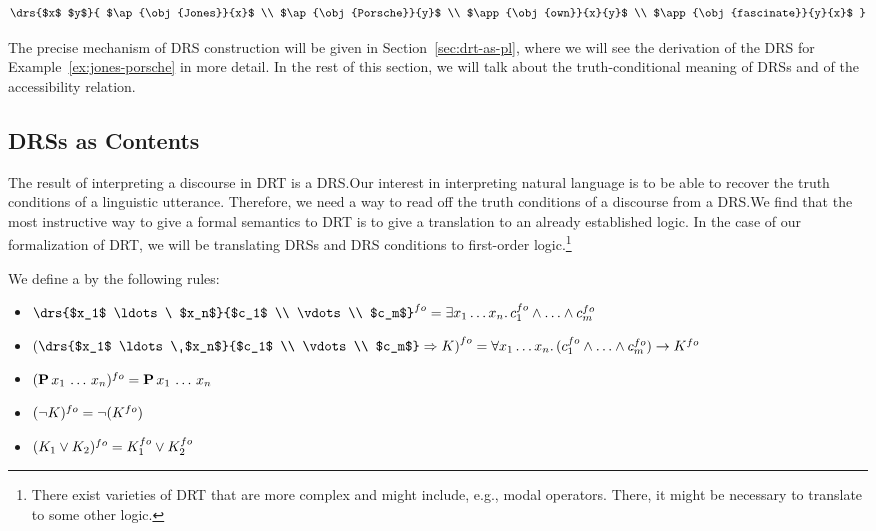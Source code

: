$$
\drs{$x$ $y$}{
  $\ap{\obj{Jones}}{x}$ \\
  $\ap{\obj{Porsche}}{y}$ \\
  $\app{\obj{own}}{x}{y}$ \\
  $\app{\obj{fascinate}}{y}{x}$
}
$$

The precise mechanism of DRS construction will be given in
Section~\ref{sec:drt-as-pl}, where we will see the derivation of the DRS
for Example~\ref{ex:jones-porsche} in more detail. In the rest of this
section, we will talk about the truth-conditional meaning of DRSs and of
the accessibility relation.


\subsection{DRSs as Contents}
\label{ssec:drt-content}

The result of interpreting a discourse in DRT is a DRS.\@ Our interest in
interpreting natural language is to be able to recover the truth conditions
of a linguistic utterance. Therefore, we need a way to read off the truth
conditions of a discourse from a DRS.\@ We find that the most instructive
way to give a formal semantics to DRT is to give a translation to an
already established logic. In the case of our formalization of DRT, we will
be translating DRSs and DRS conditions to first-order logic.\footnote{There
  exist varieties of DRT that are more complex and might include, e.g.,
  modal operators. There, it might be necessary to translate to some other
  logic.}

\begin{definition}
  We define a  by the following rules:

  \begin{itemize}
  \item $\fo{\drs{$x_1$ \ldots\ $x_n$}{$c_1$ \\ \vdots \\ $c_m$}}
  = \exists x_1 \ldots x_n.\, \fo{c_1} \land \ldots \land \fo{c_m}$
  \item $\fo{\left(\drs{$x_1$ \ldots\ $x_n$}{$c_1$ \\ \vdots \\ $c_m$} \Rightarrow K\right)}
  = \forall x_1 \ldots x_n.\, (\fo{c_1} \land \ldots \land \fo{c_m}) \to \fo{K}$
  \item $(\textbf{P}\,x_1\,\ldots\,x_n)^{fo} = \textbf{P}\,x_1\,\ldots\,x_n$
  \item $(\lnot K)^{fo} = \lnot (K^{fo})$
  \item $(K_1 \lor K_2)^{fo} = K_1^{fo} \lor K_2^{fo}$
  \end{itemize}
\end{definition}

